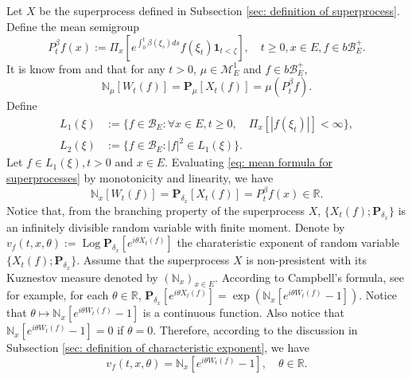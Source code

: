 \documentclass[12pt, a4paper]{amsart}
\theoremstyle{definition}
\numberwithin{equation}{section}
\begin{document}
\subsection{}
\label{sec: definition of vf}
	Let $X$ be the superprocess defined in Subsection \ref{sec: definition of superprocess}.
	Define the mean semigroup
\begin{equation}
	P_t^\beta f(x)
	:= \Pi_{x}[e^{\int_0^t \beta(\xi_s)ds}f(\xi_t) \mathbf 1_{t< \zeta}],
	\quad t\geq 0, x\in E, f\in b\mathscr B^+_E. 
\end{equation}
	It is know from \cite[Proposition 2.27]{Li2011Measure} and \cite[Theorem 2.7]{Kyprianou2014Fluctuations} that for any $t > 0$, $\mu \in \mathcal M_E^1$ and $f\in b\mathscr B^+_E$,
\begin{equation}
\label{eq: mean formula for superprocesses}
    \mathbb N_{\mu}[W_t(f)]
    =\mathbf P_{\mu}[X_t(f)]=\mu(P^\beta_t f).
\end{equation}
	Define 
\begin{align}
    L_1(\xi)
    &:= \{f\in \mathscr B_E: \forall x\in E, t\geq 0, \quad \Pi_x[|f(\xi_t)|]< \infty\},
	\\L_2(\xi)
    &:= \{f \in \mathscr B_E: |f|^2 \in L_1(\xi)\}.
\end{align}
	Let $f\in L_1(\xi), t >0$ and $x\in E$.
    Evaluating \eqref{eq: mean formula for superprocesses} by monotonicity and linearity, we have
\begin{equation}
    \mathbb N_x[W_t(f)]
    =\mathbf P_{\delta_x}[X_t(f)]=P^\beta_t f(x) \in \mathbb R.
\end{equation}
	Notice that, from the branching property of the superprocess $X$, $\{X_t(f); \mathbf P_{\delta_x}\}$ is an infinitely divisible random variable with finite moment. 
	Denote by $v_f(t,x,\theta) := \operatorname{Log} \mathbf P_{\delta_x}[e^{i\theta X_t(f)}]$ the charateristic exponent of random variable $\{X_t(f); \mathbf P_{\delta_x}\}$.
	Assume that the superprocess $X$ is non-presistent with its Kuznestov measure denoted by $(\mathbb N_x)_{x\in E}$.
	According to Campbell's formula, see \cite[Theorem 2.7]{Kyprianou2014Fluctuations} for example, for each $\theta \in \mathbb R$,
$	\mathbf P_{\delta_x} [e^{i\theta X_t(f)}] 
	= \exp(\mathbb N_x[ e^{i\theta W_t(f)} - 1]).
$
	Notice that $\theta \mapsto \mathbb N_x[e^{i\theta W_t(f)} - 1]$ is a continuous function. 
	Also notice that $\mathbb N_x[e^{i\theta W_t(f)} - 1] = 0$ if $\theta = 0$.
	Therefore, according to the discussion in Subsection \ref{sec: definition of characteristic exponent}, we have 
\begin{equation}
\label{eq: N and characteristic exponent}
	v_f(t,x,\theta) = \mathbb N_x[e^{i\theta W_t(f)} - 1],
	\quad \theta \in \mathbb R.
\end{equation}
\end{document}
